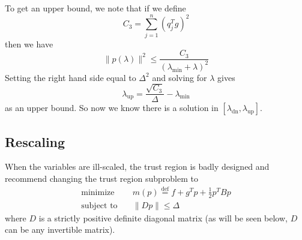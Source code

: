 \documentclass[11pt]{article}
\begin{document}
To get an upper bound, we note that
if we define
\begin{equation} \label{eq:c3}
    C_3 = 
   \sum_{j = 1}^n \left( q_j^T g \right)^2
\end{equation}
then we have
$$
   \lVert p(\lambda) \rVert^2
   \le
   \frac{C_3}{(\lambda_{\text{min}} + \lambda)^2}
$$
Setting the right hand side equal to $\Delta^2$ and solving for $\lambda$ gives
$$
   \lambda_{\text{up}} = \frac{\sqrt{C_3}}{\Delta} - \lambda_{\text{min}}
$$
as an upper bound.
So now we know there is a solution
in $[\lambda_{\text{dn}}, \lambda_{\text{up}}]$.

\subsection{Rescaling} \label{sec:subproblem-modified}

When the variables are ill-scaled, the trust region is badly designed
and \citet[Section~4.4]{naw} recommend changing the trust region
subproblem to
\begin{equation} \label{eq:problem-rescale}
\begin{split}
   \text{minimize} &
   \quad m(p) \stackrel{\text{def}}{=} f + g^T p + \tfrac{1}{2} p^T B p
   \\
   \text{subject to} & \quad \lVert D p \lVert \le \Delta
\end{split}
\end{equation}
where $D$ is a strictly positive definite diagonal matrix
(as will be seen below, $D$ can be any invertible matrix).
\end{document}
